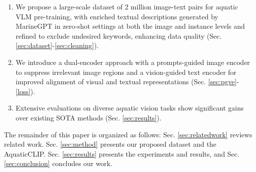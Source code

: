 \begin{enumerate}
\item We propose a large-scale dataset of 2 million image-text pairs for aquatic VLM pre-training, with enriched textual descriptions generated by MarineGPT in zero-shot settings at both the image and instance levels and refined to exclude undesired keywords, enhancing data quality (Sec. \ref{sec:dataset}-\ref{sec:cleaning}).
\item We introduce a dual-encoder approach with a prompts-guided image encoder to suppress irrelevant image regions and a vision-guided text encoder for improved alignment of visual and textual representations (Sec. \ref{sec:pgve}-\ref{loss}).
\item  Extensive evaluations on diverse aquatic vision tasks show significant gains over existing SOTA methods (Sec. \ref{sec:results}).
\end{enumerate}

\noindent The remainder of this paper is organized as follows: Sec. \ref{sec:relatedwork} reviews related work. 
Sec. \ref{sec:method} presents our proposed dataset and the AquaticCLIP. 
Sec. \ref{sec:results} presents the experiments and results, and Sec. \ref{sec:conclusion} concludes our work.

